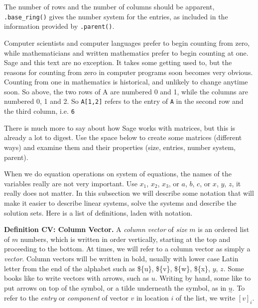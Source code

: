 \documentclass[openany]{book}
\begin{document}
\begin{compute}
\end{compute}

\begin{compute}
\end{compute}

\begin{compute}
\end{compute}

\begin{compute}
\end{compute}

The number of rows and the number of columns should be apparent,
\texttt{.base\_ring()} gives the number system for the entries, as
included in the information provided by \texttt{.parent()}.

Computer scientists and computer languages prefer to begin counting from
zero, while mathematicians and written mathematics prefer to begin
counting at one. Sage and this text are no exception. It takes some
getting used to, but the reasons for counting from zero in computer
programs soon becomes very obvious. Counting from one in mathematics is
historical, and unlikely to change anytime soon. So above, the two rows
of A are numbered 0 and 1, while the columns are numbered 0, 1 and 2. So
\texttt{A{[}1,2{]}} refers to the entry of \texttt{A} in the second row
and the third column, i.e. \texttt{6}

There is much more to say about how Sage works with matrices, but this
is already a lot to digest. Use the space below to create some matrices
(different ways) and examine them and their properties (size, entries,
number system, parent).

\begin{compute}
\end{compute}

When we do equation operations on system of equations, the names of the
variables really are not very important. Use \(x_1\), \(x_2\), \(x_3\),
or \(a\), \(b\), \(c\), or \(x\), \(y\), \(z\), it really does not
matter. In this subsection we will describe some notation that will make
it easier to describe linear systems, solve the systems and describe the
solution sets. Here is a list of definitions, laden with notation.

\textbf{Definition CV: Column Vector.} A \emph{column vector} of
\emph{size} \(m\) is an ordered list of \(m\) numbers, which is written
in order vertically, starting at the top and proceeding to the bottom.
At times, we will refer to a column vector as simply a \emph{vector}.
Column vectors will be written in bold, usually with lower case Latin
letter from the end of the alphabet such as \$\{u\}, \$\{v\}, \$\{w\},
\$\{x\}, \({y}\), \({z}\). Some books like to write vectors with arrows,
such as \({u}\). Writing by hand, some like to put arrows on top of the
symbol, or a tilde underneath the symbol, as in
\(\underset{\sim}{\textstyle u}\). To refer to the \emph{entry} or
\emph{component} of vector \({v}\) in location \(i\) of the list, we
write \([{v}]_{i}\).
\end{document}
